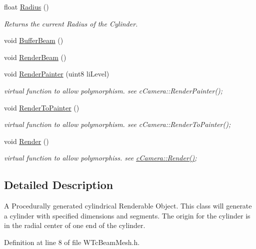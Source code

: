 \begin{DoxyCompactItemize}
float \hyperlink{classc_beam_mesh_a6068db701b4835449bd40a437e3ee908}{Radius} ()
\begin{DoxyCompactList}\small\item\em Returns the current Radius of the Cylinder. \item\end{DoxyCompactList}\item 
void \hyperlink{classc_beam_mesh_ad0a686c19fe2d46ce174c64ba6207854}{BufferBeam} ()
\item 
void \hyperlink{classc_beam_mesh_a7076bb4b100a8878e92ddc28b684fbc3}{RenderBeam} ()
\item 
void \hyperlink{classc_beam_mesh_a6020491da72676f36024237cd3db3fab}{RenderPainter} (uint8 liLevel)
\begin{DoxyCompactList}\small\item\em virtual function to allow polymorphism. see cCamera::RenderPainter(); \item\end{DoxyCompactList}\item 
void \hyperlink{classc_beam_mesh_a3a46ae2359bb9081d70a747e72a47e99}{RenderToPainter} ()
\begin{DoxyCompactList}\small\item\em virtual function to allow polymorphism. see cCamera::RenderToPainter(); \item\end{DoxyCompactList}\item 
void \hyperlink{classc_beam_mesh_a02d976199ae454b1f30ce5948de9bde7}{Render} ()
\begin{DoxyCompactList}\small\item\em virtual function to allow polymorphiss. see \hyperlink{classc_camera_acfe96d0953540fa3938e4d415d7cb791}{cCamera::Render()}; \item\end{DoxyCompactList}\end{DoxyCompactItemize}


\subsection{Detailed Description}
A Procedurally generated cylindrical Renderable Object. This class will generate a cylinder with specified dimensions and segments. The origin for the cylinder is in the radial center of one end of the cylinder. 

Definition at line 8 of file WTcBeamMesh.h.



